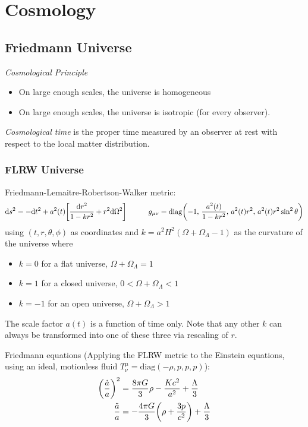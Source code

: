 \section{Cosmology}
	\subsection{Friedmann Universe}
		\emph{Cosmological Principle}
		\begin{itemize}
			\item On large enough scales, the universe is homogeneous
			\item On large enough scales, the universe is isotropic (for every observer).
		\end{itemize}

		\noindent
		\emph{Cosmological time} is the proper time measured by an observer at rest with respect to the local matter distribution.

		\subsubsection{FLRW Universe}
			Friedmann-Lemaitre-Robertson-Walker metric:
			\begin{equation}
				\dd s^2 = -\dd t^2 + a^2(t) \qty[\frac{\dd r^2}{1-kr^2} + r^2 \dd \Omega^2]
				\hspace{30pt}
				g_{\mu\nu} = \mathrm{diag}\qty(-1,\, \frac{a^2(t)}{1-kr^2},\, a^2(t) r^2,\, a^2(t) r^2 \sin^2 \theta)
			\end{equation}
			using $(t, r, \theta, \phi)$ as coordinates and $k = a^2 H^2 ( \Omega + \Omega_\Lambda - 1)$ as the curvature of the universe where
			\begin{itemize}
				\item $k=0$ for a flat universe, \ie $\Omega + \Omega_\Lambda = 1$
				\item $k=1$ for a closed universe, \ie $0 < \Omega + \Omega_\Lambda < 1$
				\item $k=-1$ for an open universe, \ie $\Omega + \Omega_\Lambda > 1$
			\end{itemize}
			The scale factor $a(t)$ is a function of time only. Note that any other $k$ can always be transformed into one of these three via rescaling of $r$.

			\noindent
			Friedmann equations (Applying the FLRW metric to the Einstein equations, using an ideal, motionless fluid $T^\mu_\nu = \text{diag}(-\rho, p, p, p)$):
			\begin{equation}
				\begin{aligned}
					\qty(\frac{\dot{a}}{a})^2 &= \frac{8 \pi G}{3} \rho - \frac{K c^2}{a^2} + \frac{\Lambda}{3} \\
					\frac{\ddot{a}}{a} &= -\frac{4 \pi G}{3} \qty(\rho + \frac{3p}{c^2}) + \frac{\Lambda}{3} \\
				\end{aligned}
			\end{equation}

